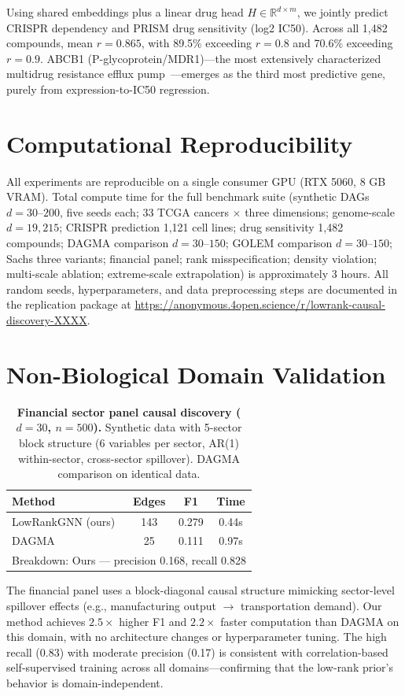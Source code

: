 \documentclass{article}
\theoremstyle{definition}
\begin{document}
Using shared embeddings plus a linear drug head $H \in \mathbb{R}^{d \times m}$, we jointly predict CRISPR dependency and PRISM drug sensitivity (log2 IC50). Across all 1,482 compounds, mean $r = 0.865$, with 89.5\% exceeding $r = 0.8$ and 70.6\% exceeding $r = 0.9$. ABCB1 (P-glycoprotein/MDR1)---the most extensively characterized multidrug resistance efflux pump~\citep{gottesman2002multidrug}---emerges as the third most predictive gene, purely from expression-to-IC50 regression.

\section{Computational Reproducibility}
\label{app:repro}

All experiments are reproducible on a single consumer GPU (RTX 5060, 8 GB VRAM). Total compute time for the full benchmark suite (synthetic DAGs $d=30$--$200$, five seeds each; 33 TCGA cancers $\times$ three dimensions; genome-scale $d=19{,}215$; CRISPR prediction 1,121 cell lines; drug sensitivity 1,482 compounds; DAGMA comparison $d=30$--$150$; GOLEM comparison $d=30$--$150$; Sachs three variants; financial panel; rank misspecification; density violation; multi-scale ablation; extreme-scale extrapolation) is approximately 3 hours. All random seeds, hyperparameters, and data preprocessing steps are documented in the replication package at \url{https://anonymous.4open.science/r/lowrank-causal-discovery-XXXX}.

\section{Non-Biological Domain Validation}
\label{app:finance}

\begin{table}[H]
\centering
\caption{\textbf{Financial sector panel causal discovery ($d=30$, $n=500$).} Synthetic data with 5-sector block structure (6 variables per sector, AR(1) within-sector, cross-sector spillover). DAGMA comparison on identical data.}
\label{tab:finance}
\small
\begin{tabular}{lccc}
\toprule
Method & Edges & F1 & Time \\
\midrule
LowRankGNN (ours) & 143 & 0.279 & 0.44s \\
DAGMA & 25 & 0.111 & 0.97s \\
\midrule
\multicolumn{4}{c}{Breakdown: Ours — precision 0.168, recall 0.828} \\
\bottomrule
\end{tabular}

The financial panel uses a block-diagonal causal structure mimicking sector-level spillover effects (e.g., manufacturing output $\rightarrow$ transportation demand). Our method achieves $2.5\times$ higher F1 and $2.2\times$ faster computation than DAGMA on this domain, with no architecture changes or hyperparameter tuning. The high recall (0.83) with moderate precision (0.17) is consistent with correlation-based self-supervised training across all domains---confirming that the low-rank prior's behavior is domain-independent.
\end{table}
\end{document}
